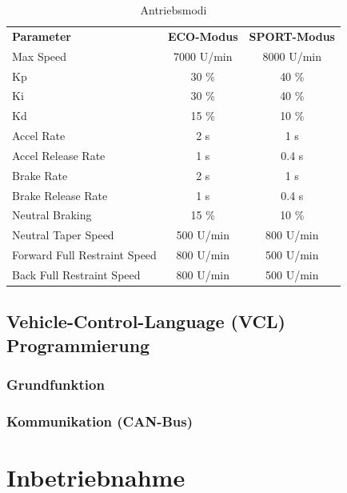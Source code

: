 \setlength{\tabcolsep}{9pt}
\begin{table}[H]
	\begin{tabular}{|lcc|}\hline
	\rowcolor[gray]{0.8}\textbf{Parameter} & \textbf{ECO-Modus} &\textbf{SPORT-Modus}\\[2pt]
		Max Speed 						& 7000 U/min	& 8000 U/min 	\\\hline
		Kp 								& 30 \% 		& 40 \% 	 	\\\hline
		Ki 								& 30 \% 		& 40 \% 	 	\\\hline
		Kd    							& 15 \% 		& 10 \%		 	\\\hline		
		Accel Rate 						& 2 s 			& 1 s		 	\\\hline
		Accel Release Rate				& 1 s 	 		& 0.4 s		 	\\\hline
		Brake Rate 						& 2 s 	 		& 1 s		 	\\\hline
		Brake Release Rate				& 1 s 	 		& 0.4 s		 	\\\hline
		Neutral Braking    				& 15 \% 		& 10 \%		 	\\\hline
		Neutral Taper Speed    			& 500 U/min 	& 800 U/min 	\\\hline
		Forward Full Restraint Speed	& 800 U/min 	& 500 U/min		\\\hline
		Back Full Restraint Speed    	& 800 U/min 	& 500 U/min		\\\hline		
	\end{tabular}	
	\caption{Antriebsmodi}
	\label{tab:Reaktions-Parameter}
\end{table}


\newpage




\subsection{Vehicle-Control-Language (VCL) Programmierung}
\subsubsection{Grundfunktion}
\subsubsection{Kommunikation (CAN-Bus)}

\newpage

\section{Inbetriebnahme}

